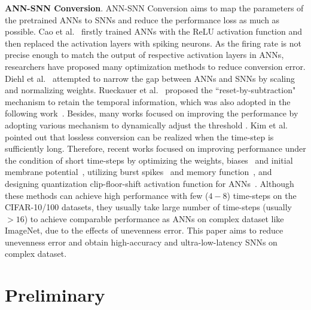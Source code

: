 \documentclass[letterpaper]{article} %
\begin{document}
\textbf{ANN-SNN Conversion}. ANN-SNN Conversion aims to map the parameters of the pretrained ANNs to SNNs and reduce the performance loss as much as possible.  Cao et al.~ firstly trained ANNs with the ReLU activation function and then replaced the activation layers with spiking neurons. As the firing rate is not precise enough to match the output of respective activation layers in ANNs, researchers have proposed many optimization methods to reduce conversion error. Diehl et al.~ attempted to narrow the gap between ANNs and SNNs by scaling and normalizing weights. Rueckauer et al.~ proposed the ``reset-by-subtraction" mechanism to retain the temporal information, which was also adopted in the following work~\cite{han2020rmp,deng2020optimal,bu2022optimal}. Besides,
many works focused on improving the performance by adopting various mechanism to dynamically adjust the threshold \cite{Bodo2017Conversion,sengupta2019going,han2020rmp,ding2021optimal,stockl2021optimized,ho2021tcl,wu2021tandem}. Kim et al.~ pointed out that lossless conversion can be realized when the time-step is sufficiently long. Therefore, recent works focused on improving performance under the condition of short time-steps by optimizing the weights, biases~\cite{deng2020optimal,li2021free} and initial membrane potential~\cite{Bu2022OPI}, utilizing burst spikes~\cite{li2022efficient} and memory function~\cite{wang2022signed}, and designing quantization clip-floor-shift activation function for ANNs~\cite{bu2022optimal}. 
Although these methods can achieve high performance with few ($4-8$) time-steps on the CIFAR-10/100 datasets, they usually take large number of time-steps (usually $>16$) to achieve comparable performance as ANNs on complex dataset like ImageNet, due to the effects of unevenness error. This paper aims to reduce unevenness error and obtain high-accuracy and ultra-low-latency SNNs on complex dataset.



\section{Preliminary}
\end{document}
